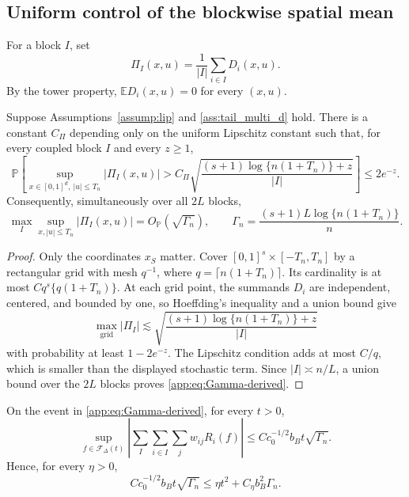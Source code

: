 \documentclass[twoside,11pt]{article}
\newenvironment{revision}{\color{revisionred}}{}
\begin{document}
\begin{revision}
\subsection{Uniform control of the blockwise spatial mean}

For a block $I$, set
\begin{equation}
 \Pi_I(x,u)=\frac1{|I|}\sum_{i\in I}D_i(x,u).                   \label{app:eq:PiI}
\end{equation}
By the tower property, $\mathbb E D_i(x,u)=0$ for every $(x,u)$.

\begin{lemma}
\label{app:lem:grid-Pi}
Suppose Assumptions~\ref{assump:lip} and \ref{ass:tail_multi_d} hold.  There is
a constant $C_\Pi$ depending only on the uniform Lipschitz constant such that,
for every coupled block $I$ and every $z\ge1$,
\begin{equation}
 \mathbb P\left[
 \sup_{x\in[0,1]^d,\ |u|\le T_n}|\Pi_I(x,u)|
 >C_\Pi\sqrt{\frac{(s+1)\log\{n(1+T_n)\}+z}{|I|}}
 \right]\le2e^{-z}.                                           \label{app:eq:Pi-tail}
\end{equation}
Consequently, simultaneously over all $2L$ blocks,
\begin{equation}
 \max_I\sup_{x,|u|\le T_n}|\Pi_I(x,u)|
 =O_{\mathbb P}(\sqrt{\Gamma_n}),
 \qquad
 \Gamma_n=\frac{(s+1)L\log\{n(1+T_n)\}}{n}.                  \label{app:eq:Gamma-derived}
\end{equation}
\end{lemma}

\begin{proof}
Only the coordinates $x_S$ matter.  Cover $[0,1]^s\times[-T_n,T_n]$ by a
rectangular grid with mesh $q^{-1}$, where $q=\lceil n(1+T_n)\rceil$.  Its cardinality is at most $Cq^s\{q(1+T_n)\}$.  At each grid point, the
summands $D_i$ are independent, centered, and bounded by one, so Hoeffding's
inequality and a union bound give
\[
 \max_{\text{grid}}|\Pi_I|
 \lesssim\sqrt{\frac{(s+1)\log\{n(1+T_n)\}+z}{|I|}}
\]
with probability at least $1-2e^{-z}$.  The Lipschitz condition adds at most
$C/q$, which is smaller than the displayed stochastic term.  Since
$|I|\asymp n/L$, a union bound over the $2L$ blocks proves
\eqref{app:eq:Gamma-derived}.
\end{proof}

\begin{lemma}
\label{app:lem:spatial-mean}
On the event in \eqref{app:eq:Gamma-derived}, for every $t>0$,
\begin{equation}
 \sup_{f\in\mathcal F_\Delta(t)}
 \left|\sum_I\sum_{i\in I}\sum_jw_{ij}R_i(f)\right|
 \le Cc_0^{-1/2}b_Bt\sqrt{\Gamma_n}.                            \label{app:eq:spatial-mean-bound}
\end{equation}
Hence, for every $\eta>0$,
\begin{equation}
 Cc_0^{-1/2}b_Bt\sqrt{\Gamma_n}
 \le \eta t^2+C_\eta b_B^2\Gamma_n.                            \label{app:eq:young-spatial}
\end{equation}
\end{lemma}


\end{revision}
\end{document}
